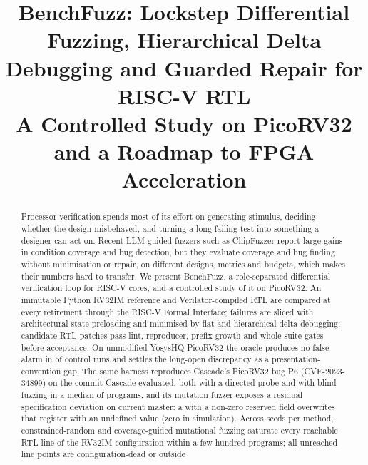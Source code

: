 \documentclass[conference,10pt]{IEEEtran}
\newcommand{\code}[1]{\texttt{\detokenize{#1}}}
\begin{document}
\title{BenchFuzz: Lockstep Differential Fuzzing, Hierarchical Delta Debugging and Guarded Repair for RISC-V RTL\\
\large A Controlled Study on PicoRV32 and a Roadmap to FPGA Acceleration}

\author{
}

\maketitle

\begin{abstract}
Processor verification spends most of its effort on generating stimulus, deciding whether the design misbehaved, and turning a
long failing test into something a designer can act on. Recent LLM-guided fuzzers such as ChipFuzzer report large gains in condition
coverage and bug detection, but they evaluate coverage and bug finding without minimisation or repair, on different designs, metrics and
budgets, which makes their numbers hard to transfer. We present BenchFuzz, a role-separated differential verification loop for RISC-V
cores, and a controlled study of it on PicoRV32. An immutable Python RV32IM reference and Verilator-compiled RTL are compared at every
retirement through the RISC-V Formal Interface; failures are sliced with architectural state preloading and minimised by flat and
hierarchical delta debugging; candidate RTL patches pass lint, reproducer, prefix-growth and whole-suite gates before acceptance. On
unmodified YosysHQ PicoRV32 the oracle produces no false alarm in \EzMasterMatched{} of \EzMasterRuns{} control runs and settles the
long-open \code{mem_addr} discrepancy as a presentation-convention gap. The same harness reproduces Cascade's PicoRV32 bug P6
(CVE-2023-34899) on the commit Cascade evaluated, both with a directed probe and with blind fuzzing in a median of \PSixRandomProgs{}
programs, and its mutation fuzzer exposes a residual specification deviation on current master: a \code{fence} with a non-zero
reserved \code{rd} field overwrites that register with an undefined value (zero in simulation). Across \CovSeeds{} seeds per method, constrained-random and coverage-guided mutational fuzzing saturate every reachable RTL line of
the RV32IM configuration within a few hundred programs; all \UnrLineUnreached{} unreached line points are configuration-dead or outside

\end{abstract}
\end{document}
